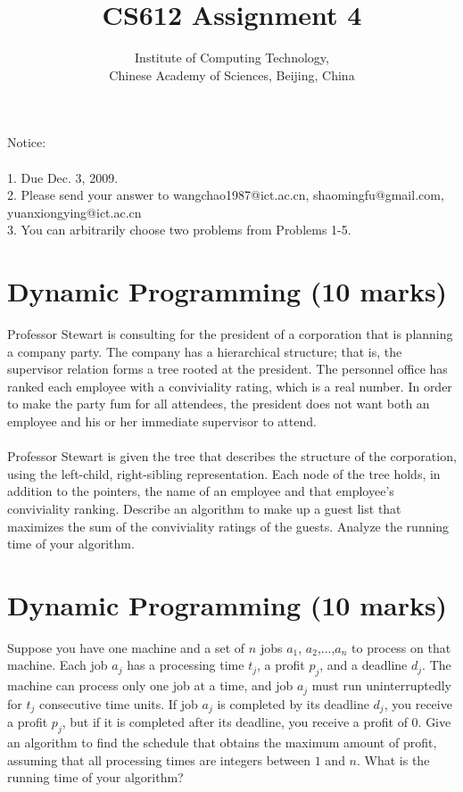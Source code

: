 \documentclass[a4paper,11pt]{article}
\title{CS612 Assignment 4}
\author{Institute of Computing Technology, \\
                       Chinese Academy of Sciences, Beijing, China }
\begin{document}
\maketitle

Notice:\\\\
1. Due Dec. 3, 2009.\\
2. Please send your answer to wangchao1987@ict.ac.cn, shaomingfu@gmail.com, yuanxiongying@ict.ac.cn\\
3. You can arbitrarily choose two problems from Problems 1-5.
\section{Dynamic Programming (10 marks)}
Professor Stewart is consulting for the president of a corporation that is planning a company party. The company has a hierarchical structure; that is, the supervisor relation forms a tree rooted at the president. The personnel office has ranked each employee with a conviviality rating, which is a real number. In order to make the party fum for all attendees, the president does not want both an employee and his or her immediate supervisor to attend.\\\\
			  Professor Stewart is given the tree that describes the structure of the corporation, using the left-child, right-sibling representation. Each node of the tree holds, in addition to the pointers, the name of an employee and that employee's conviviality ranking. Describe an algorithm to make up a guest list that maximizes the sum of the conviviality ratings of the guests. Analyze the running time of your algorithm.

\section{Dynamic Programming (10 marks)}
Suppose you have one machine and a set of $n$ jobs $a_1$, $a_2$,...,$a_n$ to process on that machine. Each job $a_j$ has a processing time $t_j$, a profit $p_j$, and a deadline $d_j$. The machine can process only one job at a time, and job $a_j$ must run uninterruptedly for $t_j$ consecutive time units. If job $a_j$ is completed by its deadline $d_j$, you receive a profit $p_j$, but if it is completed after its deadline, you receive a profit of $0$. Give an algorithm to find the schedule that obtains the maximum amount of profit, assuming that all processing times are integers between $1$ and $n$. What is the running time of your algorithm?
\end{document}
